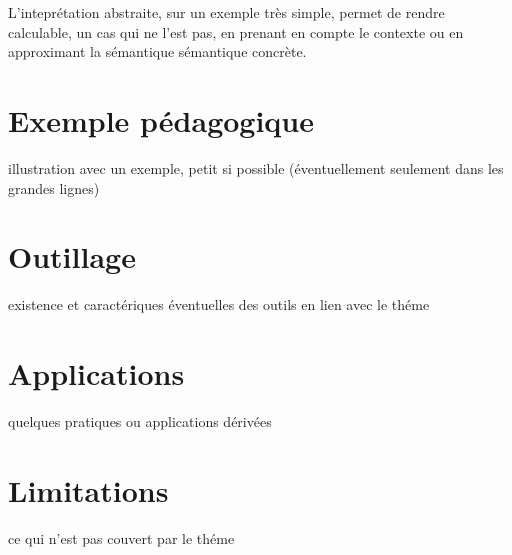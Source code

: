 \documentclass[french]{report}
\begin{document}
L'inteprétation abstraite, sur un exemple très simple, permet de rendre calculable, un cas qui ne l'est pas,
en prenant en compte le contexte ou en approximant la sémantique sémantique concrète.



\section{Exemple pédagogique}

illustration avec un exemple, petit si possible  (éventuellement seulement dans les grandes lignes)

\section{Outillage}

existence et caractériques éventuelles des outils en lien avec le théme

\section{Applications}

quelques pratiques ou applications dérivées

\section{Limitations}

ce qui n'est pas couvert par le théme
\end{document}
